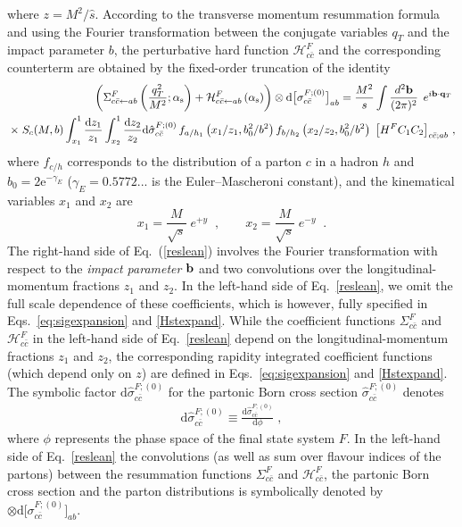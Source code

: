 \documentclass[12pt]{article}
\def\beeq{\begin{eqnarray}}
\def\eeeq{\end{eqnarray}}
\def\nn{\nonumber}
\DeclareRobustCommand{\as}{\ensuremath{\alpha_{\mathrm{s}}}}
\newcommand\f[2]{\frac{#1}{#2}}
\DeclareRobustCommand{\qt}{q_T}
\DeclareRobustCommand{\bqt}{\ensuremath{\mathbf{q}_T}}
\DeclareRobustCommand{\rd}{\ensuremath{\mathrm{d}}}
\begin{document}
where $z=M^{2}/\hat{s}$.  According to the transverse momentum resummation formula~\cite{Bozzi:2005wk} and using the Fourier transformation between the conjugate variables $\qt$ and the impact parameter $b$, the perturbative hard function $\mathcal{H}^{F}_{c\bar{c}}$ and the corresponding counterterm are obtained by the fixed-order truncation of the identity 
\beeq
\label{reslean}
&&\!\!\!\!\!\!\!\!\!\!\!\!\!\!\! \left( \Sigma^{F}_{c\bar{c}\leftarrow ab}\left(\f{\qt^{2}}{M^{2}};\as\right) + \mathcal{H}^{F}_{c\bar{c}\leftarrow ab}\left(\as\right) \right) \otimes \rd\big[\sigma^{F;(0)}_{c\bar{c}}\big]_{ab}
=\f{M^{2}}{s}
\int \f{d^2{\bf b}}{(2\pi)^2} \;\, e^{i {\bf b}\cdot \bqt} \;\\
&&\!\!\!\!\!\!\!\ \times  \;S_c(M,b) \int_{x_{1}}^1 \f{\rd z_1}{z_{1}} \int_{x_{2}}^1  \f{\rd z_2}{z_{2}} \rd\hat{\sigma}^{F;(0)}_{c\bar{c}} \,
 f_{a/h_1}\left(x_{1}/z_1,b_0^2/b^2\right)f_{b/h_2}\left(x_{2}/z_2,b_0^2/b^2\right)\;\left[ H^{F} C_1 C_2 \right]_{c\bar{c};ab}\,, \nn
\eeeq
where $f_{c/h}$ corresponds to the distribution of a parton $c$ in a hadron $h$ and $b_0=2 \mathrm{e}^{-\gamma_E}$ ($\gamma_E=0.5772...$  is the Euler--Mascheroni constant), and the kinematical variables $x_1$ and $x_2$ are 
\begin{equation}
\label{xo}
x_1= \f{M}{\sqrt s} \;e^{+y} \;\;, \quad \quad
x_2=\f{M}{\sqrt s} \;e^{-y} \;\;.
\end{equation}
The right-hand side of Eq.~(\ref{reslean}) involves the Fourier transformation with respect to the {\em impact parameter} ${\bf b}$ and two convolutions over the 
longitudinal-momentum fractions $z_1$ and $z_2$. In the left-hand side of Eq.~\eqref{reslean}, we omit the full scale dependence of these coefficients, which is however, fully specified in Eqs.~\eqref{eq:sigexpansion} and \eqref{Hstexpand}. While the coefficient functions $\Sigma^{F}_{c\bar{c}}$ and $\mathcal{H}^{F}_{c\bar{c}}$ in the left-hand side of Eq.~\eqref{reslean} depend on the longitudinal-momentum fractions $z_1$ and $z_2$, the corresponding rapidity integrated coefficient functions (which depend only on $z$) are defined in Eqs.~\eqref{eq:sigexpansion} and \eqref{Hstexpand}. The symbolic factor $\rd\hat{\sigma}^{F;(0)}_{c\bar{c}}$ for the partonic Born cross section $\hat{\sigma}^{F;(0)}_{c\bar{c}}$ denotes
\beeq
\rd\hat{\sigma}^{F;(0)}_{c\bar{c}}\equiv \f{\rd\hat{\sigma}^{F;(0)}_{c\bar{c}}}{\rd\phi}\;,
\eeeq 
where $\phi$ represents the phase space of the final state system $F$. In the left-hand side of Eq.~\eqref{reslean} the convolutions (as well as sum over flavour indices of the partons) between the resummation functions $\Sigma^{F}_{c\bar{c}}$ and $\mathcal{H}^{F}_{c\bar{c}}$, the partonic Born cross section and the parton distributions is symbolically denoted by $\otimes \rd\big[\sigma^{F;(0)}_{c\bar{c}}\big]_{ab}$.
\end{document}

